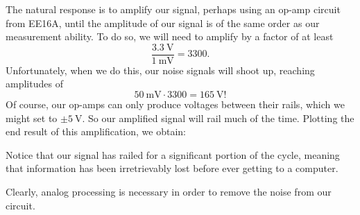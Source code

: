 \documentclass[letterpaper]{article}
\theoremstyle{remark}
\begin{document}
The natural response is to amplify our signal, perhaps using an op-amp circuit from EE16A, until the amplitude of our signal is of the same order as our measurement ability. To do so, we will need to amplify by a factor of at least
\[
    \frac{\SI{3.3}{\volt}}{\SI{1}{\milli\volt}} = 3300.
\]
Unfortunately, when we do this, our noise signals will shoot up, reaching amplitudes of
\[
    \SI{50}{\milli\volt} \cdot 3300 = \SI{165}{\volt}!
\]
Of course, our op-amps can only produce voltages between their rails, which we might set to $\pm \SI{5}{\volt}$. So our amplified signal will rail much of the time. Plotting the end result of this amplification, we obtain:
\begin{center}
\end{center}
Notice that our signal has railed for a significant portion of the cycle, meaning that information has been irretrievably lost before ever getting to a computer.

Clearly, analog processing is necessary in order to remove the noise from our circuit.
\end{document}
